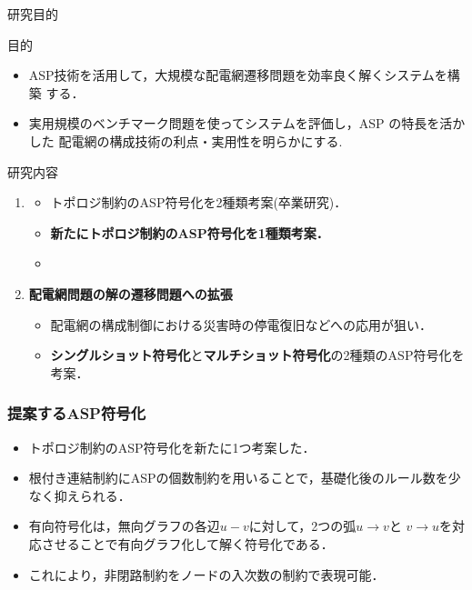 \documentclass[dvipdfmx,11pt]{beamer}
\begin{document}
\begin{frame}{研究目的}
  \begin{alertblock}{目的}
\begin{itemize}
 \item ASP技術を活用して，大規模な配電網遷移問題を効率良く解くシステムを構築
       する．
 \item 実用規模のベンチマーク問題を使ってシステムを評価し，ASP の特長を活かした
       配電網の構成技術の利点・実用性を明らかにする.
\end{itemize}
  \end{alertblock}
  \vfill
 \begin{block}{研究内容}
  \begin{enumerate}
   \item {}
   \begin{itemize}
    \item トポロジ制約のASP符号化を2種類考案(卒業研究)．
    \item \alert{\bf 新たにトポロジ制約のASP符号化を1種類考案．}
    \item {}
   \end{itemize}
   \item \alert{\bf 配電網問題の解の遷移問題への拡張}
   \begin{itemize}
    \item 配電網の構成制御における災害時の停電復旧などへの応用が狙い．
    \item \textbf{シングルショット符号化}と\textbf{マルチショット符号化}の2種類のASP符号化を考案．
   \end{itemize}
  \end{enumerate}
 \end{block}
\end{frame}
\begin{frame}\frametitle{提案するASP符号化}
 
\begin{itemize}
 \item  トポロジ制約のASP符号化を新たに1つ考案した．
\end{itemize}
 
\begin{table}[t]
 \centering
 
\end{table}

 \begin{itemize}
  \item 根付き連結制約にASPの個数制約を用いることで，基礎化後のルール数を少なく抑えられる．
  \item 有向符号化は，無向グラフの各辺$u-v$に対して，2つの弧$u\rightarrow v$と
        $v\rightarrow u$を対応させることで有向グラフ化して解く符号化である．
  \item これにより，非閉路制約をノードの入次数の制約で表現可能．
 \end{itemize}
 
\end{frame}
\end{document}
